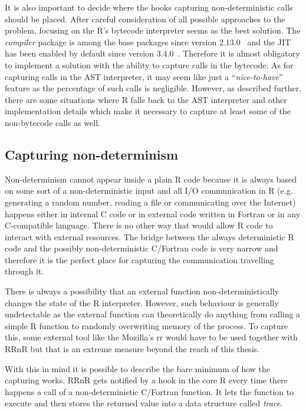 \documentclass[thesis=M,english,hidelinks]{FITthesis}[2012/10/20]
\newcommand*{\qt}[1]{\enquote{{\itshape#1}}}
\begin{document}
		It is also important to decide where the hooks capturing non-deterministic calls should be placed. After careful consideration of all possible approaches to the problem, focusing on the R's bytecode interpreter seems as the best solution. The \emph{compiler} package is among the base packages since version 2.13.0~\cite{r_compiler_included} and the JIT has been enabled by default since version 3.4.0~\cite{r_compiler_enabled}. Therefore it is almost obligatory to implement a solution with the ability to capture calls in the bytecode. As for capturing calls in the AST interpreter, it may seem like just a \qt{nice-to-have} feature as the percentage of such calls is negligible. However, as described further, there are some situations where R falls back to the AST interpreter and other implementation details which make it necessary to capture at least some of the non-bytecode calls as well.\par
	
		\subsection{Capturing non-determinism}
		Non-determinism cannot appear inside a plain R code because it is always based on some sort of a non-deterministic input and all I/O communication in R (e.g. generating a random number, reading a file or communicating over the Internet) happens either in internal C code or in external code written in Fortran or in any C-compatible language. There is no other way that would allow R code to interact with external resources. The bridge between the always deterministic R code and the possibly non-deterministic C/Fortran code is very narrow and therefore it is the perfect place for capturing the communication travelling through it.\par
		
		There is always a possibility that an external function non-deterministically changes the state of the R interpreter. However, such behaviour is generally undetectable as the external function can theoretically do anything from calling a simple R function to randomly overwriting memory of the process. To capture this, some external tool like the Mozilla's rr would have to be used together with RRnR but that is an extreme measure beyond the reach of this thesis.\par
		
		With this in mind it is possible to describe the bare minimum of how the capturing works. RRnR gets notified by a hook in the core R every time there happens a call of a non-deterministic C/Fortran function. It lets the function to execute and then stores the returned value into a data structure called \emph{trace}.\par
		
\end{document}
